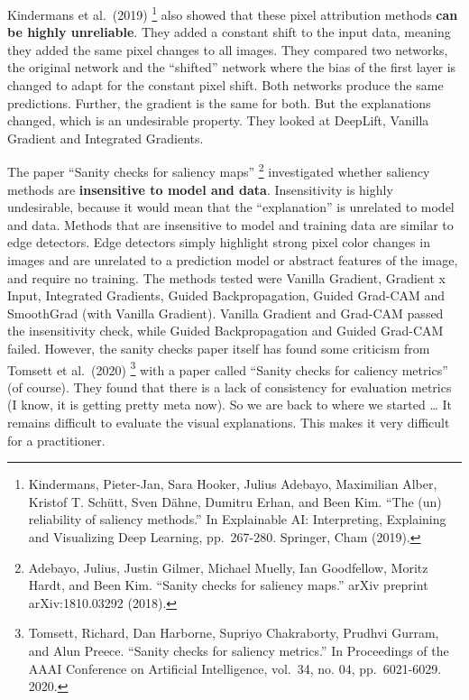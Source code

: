 \documentclass[
  11pt,
]{scrbook}
\begin{document}
Kindermans et al.~(2019) \footnote{Kindermans, Pieter-Jan, Sara Hooker, Julius Adebayo, Maximilian Alber, Kristof T. Schütt, Sven Dähne, Dumitru Erhan, and Been Kim. ``The (un) reliability of saliency methods.'' In Explainable AI: Interpreting, Explaining and Visualizing Deep Learning, pp.~267-280. Springer, Cham (2019).} also showed that these pixel attribution methods \textbf{can be highly unreliable}.
They added a constant shift to the input data, meaning they added the same pixel changes to all images.
They compared two networks, the original network and the ``shifted'' network where the bias of the first layer is changed to adapt for the constant pixel shift.
Both networks produce the same predictions.
Further, the gradient is the same for both.
But the explanations changed, which is an undesirable property.
They looked at DeepLift, Vanilla Gradient and Integrated Gradients.

The paper ``Sanity checks for saliency maps'' \footnote{Adebayo, Julius, Justin Gilmer, Michael Muelly, Ian Goodfellow, Moritz Hardt, and Been Kim. ``Sanity checks for saliency maps.'' arXiv preprint arXiv:1810.03292 (2018).} investigated whether saliency methods are \textbf{insensitive to model and data}.
Insensitivity is highly undesirable, because it would mean that the ``explanation'' is unrelated to model and data.
Methods that are insensitive to model and training data are similar to edge detectors.
Edge detectors simply highlight strong pixel color changes in images and are unrelated to a prediction model or abstract features of the image, and require no training.
The methods tested were Vanilla Gradient, Gradient x Input, Integrated Gradients, Guided Backpropagation, Guided Grad-CAM and SmoothGrad (with Vanilla Gradient).
Vanilla Gradient and Grad-CAM passed the insensitivity check, while Guided Backpropagation and Guided Grad-CAM failed.
However, the sanity checks paper itself has found some criticism from Tomsett et al.~(2020) \footnote{Tomsett, Richard, Dan Harborne, Supriyo Chakraborty, Prudhvi Gurram, and Alun Preece. ``Sanity checks for saliency metrics.'' In Proceedings of the AAAI Conference on Artificial Intelligence, vol.~34, no. 04, pp.~6021-6029. 2020.} with a paper called ``Sanity checks for caliency metrics'' (of course).
They found that there is a lack of consistency for evaluation metrics (I know, it is getting pretty meta now).
So we are back to where we started \ldots{} It remains difficult to evaluate the visual explanations.
This makes it very difficult for a practitioner.
\end{document}
